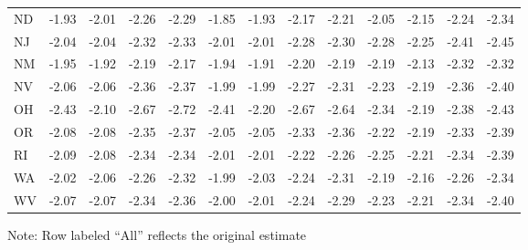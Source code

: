 \begin{landscape}
\begin{table}[H]
\begin{longtable}{lrrrr|rrrr|rrrr}
ND & -1.93 & -2.01 & -2.26 & -2.29 & -1.85 & -1.93 & -2.17 & -2.21 & -2.05 & -2.15 & -2.24 & -2.34 \\ 
NJ & -2.04 & -2.04 & -2.32 & -2.33 & -2.01 & -2.01 & -2.28 & -2.30 & -2.28 & -2.25 & -2.41 & -2.45 \\ 
NM & -1.95 & -1.92 & -2.19 & -2.17 & -1.94 & -1.91 & -2.20 & -2.19 & -2.19 & -2.13 & -2.32 & -2.32 \\ 
NV & -2.06 & -2.06 & -2.36 & -2.37 & -1.99 & -1.99 & -2.27 & -2.31 & -2.23 & -2.19 & -2.36 & -2.40 \\ 
OH & -2.43 & -2.10 & -2.67 & -2.72 & -2.41 & -2.20 & -2.67 & -2.64 & -2.34 & -2.19 & -2.38 & -2.43 \\ 
OR & -2.08 & -2.08 & -2.35 & -2.37 & -2.05 & -2.05 & -2.33 & -2.36 & -2.22 & -2.19 & -2.33 & -2.39 \\ 
RI & -2.09 & -2.08 & -2.34 & -2.34 & -2.01 & -2.01 & -2.22 & -2.26 & -2.25 & -2.21 & -2.34 & -2.39 \\ 
WA & -2.02 & -2.06 & -2.26 & -2.32 & -1.99 & -2.03 & -2.24 & -2.31 & -2.19 & -2.16 & -2.26 & -2.34 \\ 
WV & -2.07 & -2.07 & -2.34 & -2.36 & -2.00 & -2.01 & -2.24 & -2.29 & -2.23 & -2.21 & -2.34 & -2.40 \\ 
 \hline
\end{longtable}
\begin{tablenotes}
  Note: Row labeled ``All'' reflects the original estimate
\end{tablenotes}
\end{table}


\end{landscape}
